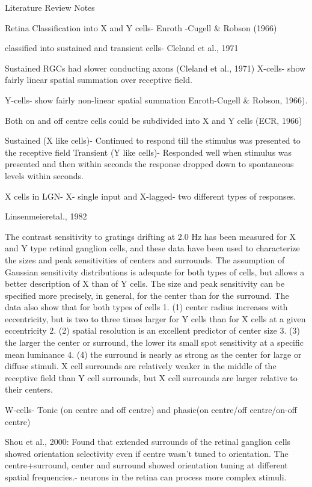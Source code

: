Literature Review Notes

Retina
Classification into X and Y cells- Enroth -Cugell \& Robson (1966)

classified into sustained and transient cells- Cleland et al., 1971

Sustained RGCs had slower conducting axons (Cleland et al., 1971)
X-cells- show fairly linear spatial summation over receptive field.

Y-cells- show fairly non-linear spatial summation Enroth-Cugell \& Robson, 1966).

Both on and off centre cells could be subdivided into X and Y cells (ECR, 1966)

Sustained (X like cells)- Continued to respond till the stimulus was presented to the receptive field
Transient (Y like cells)- Responded well when stimulus was presented and then within seconds the response dropped down to spontaneous levels within seconds.

X cells in LGN- X- single input and X-lagged- two different types of responses.

Linsenmeieretal., 1982 

The contrast sensitivity to gratings drifting at 2.0 Hz has been measured for X and Y type retinal ganglion cells, and these data have been used to characterize the sizes and peak sensitivities of centers and surrounds. The assumption of Gaussian sensitivity distributions is adequate for both types of cells, but allows a better description of X than of Y cells. The size and peak sensitivity can be specified more precisely, in general, for the center than for the surround. The data also show that for both types of cells 1. (1) center radius increases with eccentricity, but is two to three times larger for Y cells than for X cells at a given eccentricity 2. (2) spatial resolution is an excellent predictor of center size 3. (3) the larger the center or surround, the lower its small spot sensitivity at a specific mean luminance 4. (4) the surround is nearly as strong as the center for large or diffuse stimuli. X cell surrounds are relatively weaker in the middle of the receptive field than Y cell surrounds, but X cell surrounds are larger relative to their centers.

W-cells- Tonic (on centre and off centre) and phasic(on centre/off centre/on-off centre)

Shou et al., 2000: Found that extended surrounds of the retinal ganglion cells showed orientation selectivity even if centre wasn't tuned to orientation. The centre+surround, center and surround showed orientation tuning at different spatial frequencies.- neurons in the retina can process more complex stimuli.

